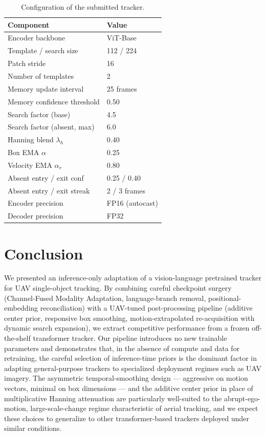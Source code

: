 \documentclass[10pt,twocolumn,letterpaper]{article}
\begin{document}
\begin{table}[t]
\centering
\small
\caption{Configuration of the submitted tracker.}
\label{tab:config}
\begin{tabular}{ll}
\toprule
Component & Value \\
\midrule
Encoder backbone           & ViT-Base \\
Template / search size     & 112 / 224 \\
Patch stride               & 16 \\
Number of templates        & 2 \\
Memory update interval     & 25 frames \\
Memory confidence threshold & 0.50 \\
Search factor (base)       & 4.5 \\
Search factor (absent, max) & 6.0 \\
Hanning blend $\lambda_h$  & 0.40 \\
Box EMA $\alpha$           & 0.25 \\
Velocity EMA $\alpha_v$    & 0.80 \\
Absent entry / exit conf   & 0.25 / 0.40 \\
Absent entry / exit streak & 2 / 3 frames \\
Encoder precision          & FP16 (autocast) \\
Decoder precision          & FP32 \\
\bottomrule
\end{tabular}
\end{table}

\section{Conclusion}

We presented an inference-only adaptation of a vision-language pretrained tracker for UAV single-object tracking. By combining careful checkpoint surgery (Channel-Fused Modality Adaptation, language-branch removal, positional-embedding reconciliation) with a UAV-tuned post-processing pipeline (additive center prior, responsive box smoothing, motion-extrapolated re-acquisition with dynamic search expansion), we extract competitive performance from a frozen off-the-shelf transformer tracker. Our pipeline introduces no new trainable parameters and demonstrates that, in the absence of compute and data for retraining, the careful selection of inference-time priors is the dominant factor in adapting general-purpose trackers to specialized deployment regimes such as UAV imagery. The asymmetric temporal-smoothing design --- aggressive on motion vectors, minimal on box dimensions --- and the additive center prior in place of multiplicative Hanning attenuation are particularly well-suited to the abrupt-ego-motion, large-scale-change regime characteristic of aerial tracking, and we expect these choices to generalize to other transformer-based trackers deployed under similar conditions.
\end{document}
